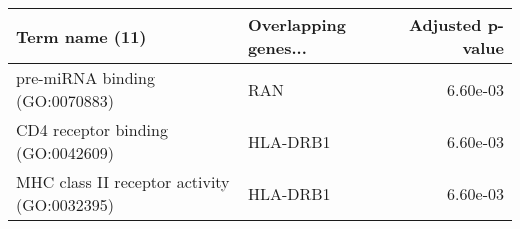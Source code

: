 \begin{tabular}{llr}
\toprule
                             Term name (11) & Overlapping genes... &  Adjusted p-value \\
\midrule
             pre-miRNA binding (GO:0070883) &                  RAN &          6.60e-03 \\
          CD4 receptor binding (GO:0042609) &             HLA-DRB1 &          6.60e-03 \\
MHC class II receptor activity (GO:0032395) &             HLA-DRB1 &          6.60e-03 \\
\bottomrule
\end{tabular}

